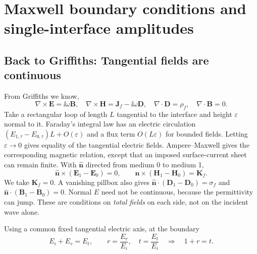 
\section{Maxwell boundary conditions and single-interface amplitudes}
\subsection{Back to Griffiths: Tangential fields are continuous}
From Griffiths we know,
\begin{equation}
\nabla\times\mathbf E=\ii\omega\mathbf B,
\quad \nabla\times\mathbf H=\mathbf J_f-\ii\omega\mathbf D,
\quad \nabla\cdot\mathbf D=\rho_f,
\quad \nabla\cdot\mathbf B=0.
\end{equation}
Take a rectangular loop of length $L$ tangential to the interface and height $\varepsilon$ normal to it. Faraday's integral law has an electric circulation $(E_{1,\tau}-E_{0,\tau})L+O(\varepsilon)$ and a flux term $O(L\varepsilon)$ for bounded fields. Letting $\varepsilon\to0$ gives equality of the tangential electric fields. Ampere--Maxwell gives the corresponding magnetic relation, except that an imposed surface-current sheet can remain finite. With $\widehat{\mathbf n}$ directed from medium 0 to medium 1,
\begin{equation}
\boxed{\widehat{\mathbf n}\times(\mathbf E_1-\mathbf E_0)=0,
\qquad \widehat{\mathbf n}\times(\mathbf H_1-\mathbf H_0)=\mathbf K_f.}
\label{eq:bc}
\end{equation}
We take $\mathbf K_f=0$. A vanishing pillbox also gives
$\widehat{\mathbf n}\cdot(\mathbf D_1-\mathbf D_0)=\sigma_f$ and
$\widehat{\mathbf n}\cdot(\mathbf B_1-\mathbf B_0)=0$.
Normal $E$ need not be continuous, because the permittivity can jump. These are conditions on \emph{total fields} on each side, not on the incident wave alone.

Using a common fixed tangential electric axis, at the boundary
\begin{equation}
E_i+E_r=E_t,\qquad r=\frac{E_r}{E_i},\quad t=\frac{E_t}{E_i}
\quad\Longrightarrow\quad\boxed{1+r=t.}
\label{eq:Ebc}
\end{equation}

